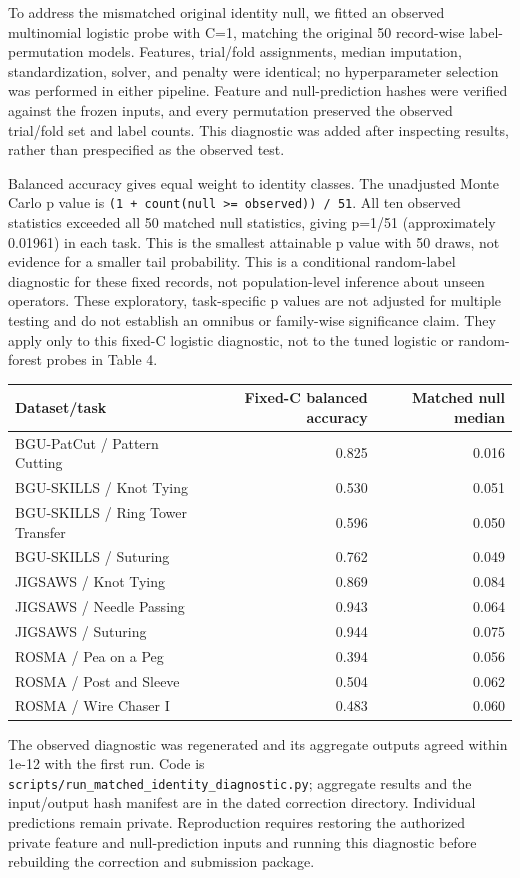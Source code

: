 \documentclass[11pt]{article}
\begin{document}
To address the mismatched original identity null, we fitted an observed
multinomial logistic probe with C=1, matching the original 50
record-wise label-permutation models. Features, trial/fold assignments,
median imputation, standardization, solver, and penalty were identical;
no hyperparameter selection was performed in either pipeline. Feature
and null-prediction hashes were verified against the frozen inputs, and
every permutation preserved the observed trial/fold set and label
counts. This diagnostic was added after inspecting results, rather than
prespecified as the observed test.

Balanced accuracy gives equal weight to identity classes. The unadjusted
Monte Carlo p value is
\texttt{(1\ +\ count(null\ \textgreater{}=\ observed))\ /\ 51}. All ten
observed statistics exceeded all 50 matched null statistics, giving
p=1/51 (approximately 0.01961) in each task. This is the smallest
attainable p value with 50 draws, not evidence for a smaller tail
probability. This is a conditional random-label diagnostic for these
fixed records, not population-level inference about unseen operators.
These exploratory, task-specific p values are not adjusted for multiple
testing and do not establish an omnibus or family-wise significance
claim. They apply only to this fixed-C logistic diagnostic, not to the
tuned logistic or random-forest probes in Table 4.

{\def\LTcaptype{none} %
\begin{longtable}[]{@{}lrr@{}}
\toprule\noalign{}
Dataset/task & Fixed-C balanced accuracy & Matched null median \\
\midrule\noalign{}
\endhead
\bottomrule\noalign{}
\endlastfoot
BGU-PatCut / Pattern Cutting & 0.825 & 0.016 \\
BGU-SKILLS / Knot Tying & 0.530 & 0.051 \\
BGU-SKILLS / Ring Tower Transfer & 0.596 & 0.050 \\
BGU-SKILLS / Suturing & 0.762 & 0.049 \\
JIGSAWS / Knot Tying & 0.869 & 0.084 \\
JIGSAWS / Needle Passing & 0.943 & 0.064 \\
JIGSAWS / Suturing & 0.944 & 0.075 \\
ROSMA / Pea on a Peg & 0.394 & 0.056 \\
ROSMA / Post and Sleeve & 0.504 & 0.062 \\
ROSMA / Wire Chaser I & 0.483 & 0.060 \\
\end{longtable}
}

The observed diagnostic was regenerated and its aggregate outputs agreed
within 1e-12 with the first run. Code is
\texttt{scripts/run\_matched\_identity\_diagnostic.py}; aggregate
results and the input/output hash manifest are in the dated correction
directory. Individual predictions remain private. Reproduction requires
restoring the authorized private feature and null-prediction inputs and
running this diagnostic before rebuilding the correction and submission
package.



\end{document}
